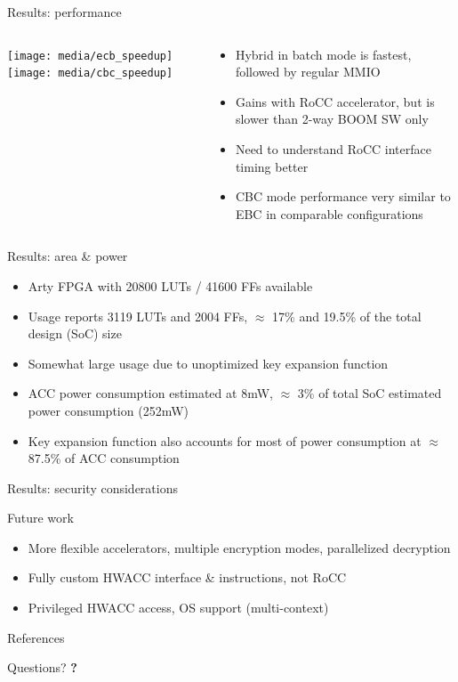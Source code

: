 \documentclass[dvipsnames]{beamer}
\begin{document}
\begin{frame}{Results: performance}
  \begin{columns}[T]
  \begin{column}{0.5\textwidth}
  \texttt{[image: media/ecb\_speedup]}
  \texttt{[image: media/cbc\_speedup]}
  \end{column}
  \begin{column}{0.5\textwidth}
  \begin{itemize}
    \item Hybrid in batch mode is fastest, followed by regular MMIO
    \item Gains with RoCC accelerator, but is slower than 2-way BOOM SW only
    \item Need to understand RoCC interface timing better
    \item CBC mode performance very similar to EBC in comparable configurations
  \end{itemize}
  \end{column}
  \end{columns}
\end{frame}

\begin{frame}{Results: area \& power}
  \begin{itemize}
  \item Arty FPGA with 20800 LUTs / 41600 FFs available
  \item Usage reports 3119 LUTs and 2004 FFs, $\approx$ 17\% and 19.5\% of the
    total design (SoC) size
  \item Somewhat large usage due to unoptimized key expansion function
  \item ACC power consumption estimated at 8mW, $\approx$ 3\% of total SoC
    estimated power consumption (252mW)
  \item Key expansion function also accounts for most of power consumption at
    $\approx$ 87.5\% of ACC consumption
  \end{itemize}
\end{frame}

\begin{frame}{Results: security considerations}
\end{frame}

\begin{frame}{Future work}
  \begin{itemize}
  \item More flexible accelerators, multiple encryption modes, parallelized decryption
  \item Fully custom HWACC interface \& instructions, not RoCC
  \item Privileged HWACC access, OS support (multi-context)
  \end{itemize}
\end{frame}

\begin{frame}[allowframebreaks]{References}
  \tiny
  \nocite{*}
  
  
\end{frame}

\begin{frame}{Questions?}
  \centering
  \huge\bfseries ?
\end{frame}
\end{document}
